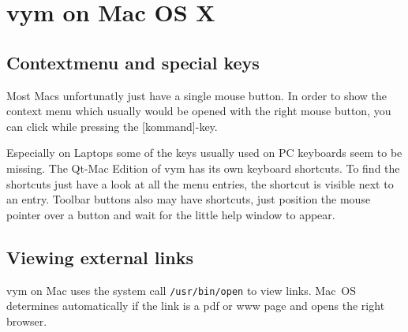 \documentclass[12pt,a4paper]{article}
\newcommand{\vym}{{\sc vym }}
\newcommand{\key}[1]{[#1]}
\begin{document}
\section{\vym on Mac OS X}


    

\subsection {Contextmenu and special keys}
Most Macs unfortunatly just have a single mouse button. In order to show
the context menu which usually would be opened with the right mouse
button, you can click while pressing the \key{kommand}-key.

Especially on Laptops some of the keys usually used on PC keyboards seem
to be missing. The Qt-Mac Edition of \vym has its own keyboard
shortcuts. To find the shortcuts just have a look at all the menu
entries, the shortcut is visible next to an entry. Toolbar buttons also
may have shortcuts, just position the mouse pointer over a button and
wait for the little help window to appear. 

\subsection {Viewing external links}
\vym on Mac uses the system call {\tt /usr/bin/open} to view links.
Mac~OS determines automatically if the link is a pdf or www page and
opens the right browser.
\end{document}
